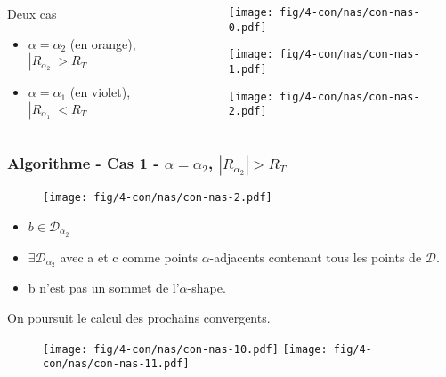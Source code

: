 \begin{frame}
\begin{columns}[t]
\begin{column}{0.7\linewidth}
{      \begin{alertblock}{Deux cas}
        \begin{itemize}
          \item $\alpha = \alpha_{2}$ (en orange), \textbf{$|R_{\alpha_{2}}| > R_T$}
          \item $\alpha = \alpha_{1}$ (en violet), \textbf{$|R_{\alpha_{1}}| < R_T$}
        \end{itemize}
       \end{alertblock}
    }

  \end{column}
  \begin{column}{0.3\linewidth}
    {
      \begin{figure}[H]
        \centering
        \texttt{[image: fig/4-con/nas/con-nas-0.pdf]}
      \end{figure}
    }
    {
      \begin{figure}[H]
        \centering
        \texttt{[image: fig/4-con/nas/con-nas-1.pdf]}
      \end{figure}
    }
    {
      \begin{figure}[H]
        \centering
        \texttt{[image: fig/4-con/nas/con-nas-2.pdf]}
      \end{figure}
    }
  \end{column}
\end{columns}
\end{frame}

\begin{frame}
\frametitle{Algorithme - Cas 1 - $\alpha = \alpha_{2}$, $|R_{\alpha_{2}}| > R_T$}
{
  \begin{figure}[H]
    \centering
    \texttt{[image: fig/4-con/nas/con-nas-2.pdf]}
  \end{figure}
}

\begin{block}{}
\begin{itemize}
  \item $b \in \mathcal{D}_{\alpha_2}$
  \item $\exists \mathcal{D}_{\alpha_2}$ avec a et c comme points $\alpha$-adjacents contenant tous les points de $\mathcal{D}$.  
  \item \alert{b n'est pas un sommet de l'$\alpha$-shape.}
\end{itemize}

\end{block}

{
  \begin{block}{}
    On poursuit le calcul des prochains convergents.
  \end{block}

  \begin{figure}[H]
    \centering
    \texttt{[image: fig/4-con/nas/con-nas-10.pdf]}
    \texttt{[image: fig/4-con/nas/con-nas-11.pdf]}
  \end{figure}
}

\end{frame}


